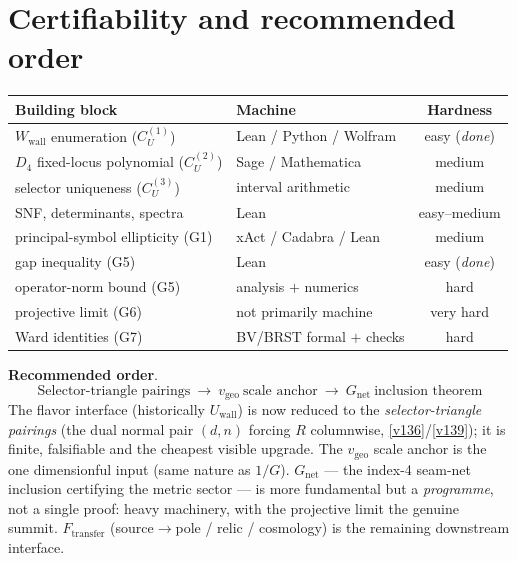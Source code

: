 \documentclass[11pt,a4paper]{article}
\begin{document}
\section*{Certifiability and recommended order}
\begin{center}\footnotesize
\renewcommand{\arraystretch}{1.2}
\begin{tabularx}{\linewidth}{@{}Ylc@{}}
\toprule
\textbf{Building block} & \textbf{Machine} & \textbf{Hardness} \\
\midrule
$W_{\mathrm{wall}}$ enumeration ($C_U^{(1)}$) & Lean / Python / Wolfram & easy (\emph{done}) \\
$D_4$ fixed-locus polynomial ($C_U^{(2)}$) & Sage / Mathematica & medium \\
selector uniqueness ($C_U^{(3)}$) & interval arithmetic & medium \\
SNF, determinants, spectra & Lean & easy--medium \\
principal-symbol ellipticity (G1) & xAct / Cadabra / Lean & medium \\
gap inequality (G5) & Lean & easy (\emph{done}) \\
operator-norm bound (G5) & analysis $+$ numerics & hard \\
projective limit (G6) & not primarily machine & very hard \\
Ward identities (G7) & BV/BRST formal $+$ checks & hard \\
\bottomrule
\end{tabularx}
\end{center}

\par\smallskip\noindent\textbf{Recommended order}.
\[
  \boxed{\ \text{Selector-triangle pairings}\ \rightarrow\ v_{\mathrm{geo}}\ \text{scale anchor}\ \rightarrow\ G_{\mathrm{net}}\ \text{inclusion theorem}\ }
\]
The flavor interface (historically $U_{\mathrm{wall}}$) is now reduced to the \emph{selector-triangle
pairings} (the dual normal pair $(d,n)$ forcing $R$ columnwise, \vref{v136}/\vref{v139}); it is finite,
falsifiable and the cheapest visible upgrade. The $v_{\mathrm{geo}}$ scale anchor is the one dimensionful
input (same nature as $1/G$). $G_{\mathrm{net}}$ --- the index-4 seam-net inclusion certifying the metric
sector --- is more fundamental but a \emph{programme}, not a single proof: heavy machinery, with the
projective limit the genuine summit. $F_{\mathrm{transfer}}$ (source$\to$pole / relic / cosmology) is the
remaining downstream interface.
\end{document}
